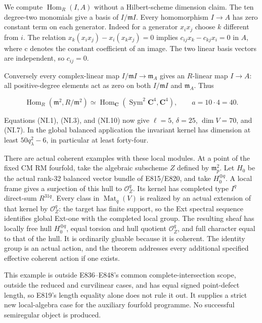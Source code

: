 We compute \(\operatorname{Hom}_R(I,A)\) without a Hilbert-scheme dimension claim.
The ten degree-two monomials give a basis of \(I/\mathfrak m I\). Every
homomorphism \(I\to A\) has zero constant term on each generator.
Indeed for a generator \(x_ix_j\) choose \(k\) different from \(i\).
The relation
\(x_k(x_ix_j)-x_i(x_kx_j)=0\) implies
\(c_{ij}x_k-c_{kj}x_i=0\) in \(A\), where c denotes the constant
coefficient of an image. The two linear basis vectors are
independent, so \(c_{ij}=0\).

Conversely every complex-linear map \(I/\mathfrak m I\to\mathfrak m_A\) gives an
\(R\)-linear map \(I\to A\): all positive-degree elements act as zero
on both \(I/\mathfrak m I\) and \(\mathfrak m_A\). Thus

\[
 \operatorname{Hom}_R(\mathfrak m^2,R/\mathfrak m^2)
     \simeq\operatorname{Hom}_{\mathbf C}
           (\operatorname{Sym}^2\mathbf C^4,\mathbf C^4),
 \qquad a=10\cdot4=40.
 \tag{NI.25}
\]

Equations (NI.1), (NI.3), and (NI.10) now give \(\ell=5\),
\(\delta=25\), \(\dim V=70\), and (NI.7). In the global balanced
application the invariant kernel has dimension at least
\(50q_{\lambda}^2-6\), in particular at least forty-four.

There are actual coherent examples with these local modules.
At a point of the fixed CM RM fourfold, take the algebraic
subscheme \(Z\) defined by \(\mathfrak m_p^2\). Let \(H_0\) be the actual rank-32
balanced vector bundle of E815/E820, and take \(H_0^{\oplus q}\).
A local frame gives a surjection of this hull to \(\mathcal O_Z^q\).
Its kernel has completed type \(I^q\) direct-sum \(R^{31q}\).
Every class in \(\operatorname{Mat}_q(V)\) is realized by an actual extension
of that kernel by \(\mathcal O_Z^q\): the target has finite support, so the
Ext spectral sequence identifies global Ext-one with the
completed local group. The resulting sheaf has locally free
hull \(H_0^{\oplus q}\), equal torsion and hull quotient \(\mathcal O_Z^q\),
and full character equal to that of the hull. It is ordinarily
gluable because it is coherent. The identity group is an
actual action, and the theorem addresses every additional
specified effective coherent action if one exists.

This example is outside E836--E848's common complete-intersection
scope, outside the reduced and curvilinear cases, and has equal
signed point-defect length, so E819's length equality alone
does not rule it out. It supplies a strict new local-algebra
case for the auxiliary fourfold programme. No successful
semiregular object is produced.

